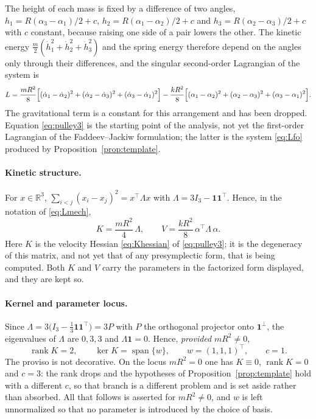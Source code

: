 \documentclass[12pt]{article}
\theoremstyle{plain}
\theoremstyle{definition}
\theoremstyle{remark}
\newcommand{\R}{\mathbb{R}}
\DeclareMathOperator{\rank}{rank}
\DeclareMathOperator{\spn}{span}
\begin{document}
	The height of each mass is fixed by a difference of two angles,
	$h_{1}=R(\alpha_{3}-\alpha_{1})/2+c$, $h_{2}=R(\alpha_{1}-\alpha_{2})/2+c$ and
	$h_{3}=R(\alpha_{2}-\alpha_{3})/2+c$ with $c$ constant, because raising one side
	of a pair lowers the other. The kinetic energy
	$\tfrac m2(\dot h_{1}^{2}+\dot h_{2}^{2}+\dot h_{3}^{2})$ and the spring energy
	therefore depend on the angles only through their differences, and the singular
	second-order Lagrangian of the system is
	\begin{equation}
		L=\frac{mR^{2}}{8}\Bigl[(\dot\alpha_{1}-\dot\alpha_{2})^{2}
		+(\dot\alpha_{2}-\dot\alpha_{3})^{2}
		+(\dot\alpha_{3}-\dot\alpha_{1})^{2}\Bigr]
		-\frac{kR^{2}}{8}\Bigl[(\alpha_{1}-\alpha_{2})^{2}
		+(\alpha_{2}-\alpha_{3})^{2}
		+(\alpha_{3}-\alpha_{1})^{2}\Bigr].
		\label{eq:pulley3}
	\end{equation}
	The gravitational term is a constant for this arrangement and has been dropped.
	Equation \eqref{eq:pulley3} is the starting point of the analysis, not yet the
	first-order Lagrangian of the Faddeev--Jackiw formulation; the latter is the
	system \eqref{eq:Lfo} produced by Proposition~\ref{prop:template}.
	
	\paragraph{Kinetic structure.} For $x\in\R^{3}$,
	$\sum_{i<j}(x_{i}-x_{j})^{2}=x^{\top}\Lambda x$ with
	$\Lambda=3I_{3}-\mathbf{1}\mathbf{1}^{\top}$. Hence, in the notation of
	\eqref{eq:Lmech},
	\begin{equation}
		K=\frac{mR^{2}}{4}\,\Lambda,
		\qquad
		V=\frac{kR^{2}}{8}\,\alpha^{\top}\Lambda\,\alpha .
		\label{eq:pulley3K}
	\end{equation}
	Here $K$ is the velocity Hessian \eqref{eq:Khessian} of \eqref{eq:pulley3}; it
	is the degeneracy of this matrix, and not yet that of any presymplectic form,
	that is being computed. Both $K$ and $V$ carry the parameters in the
	factorized form displayed, and they are kept so.
	
	\paragraph{Kernel and parameter locus.} Since
	$\Lambda=3\bigl(I_{3}-\tfrac13\mathbf{1}\mathbf{1}^{\top}\bigr)=3P$ with $P$ the
	orthogonal projector onto $\mathbf{1}^{\perp}$, the eigenvalues of $\Lambda$ are
	$0,3,3$ and $\Lambda\mathbf{1}=0$. Hence, \emph{provided} $mR^{2}\neq0$,
	\begin{equation}
		\rank K=2,
		\qquad
		\ker K=\spn\{w\},\qquad w=(1,1,1)^{\top},
		\qquad c=1 .
		\label{eq:pulley3ker}
	\end{equation}
	The proviso is not decorative. On the locus $mR^{2}=0$ one has $K\equiv0$,
	$\rank K=0$ and $c=3$: the rank drops and the hypotheses of
	Proposition~\ref{prop:template} hold with a different $c$, so that branch is a
	different problem and is set aside rather than absorbed. All that follows is
	asserted for $mR^{2}\neq0$, and $w$ is left unnormalized so that no parameter
	is introduced by the choice of basis.
	
\end{document}
